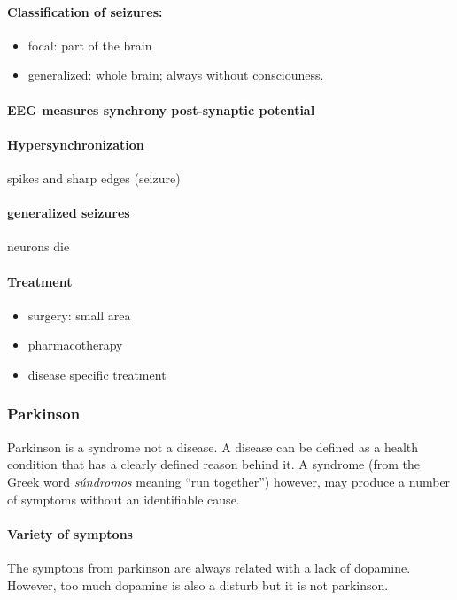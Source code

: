 \documentclass[12pt,article,oneside,a4paper]{memoir}
\begin{document}
\paragraph{Classification of seizures:}
\begin{itemize}
\item focal: part of the brain
\item generalized: whole brain; always without consciouness.
\end{itemize}

\paragraph{EEG measures synchrony post-synaptic potential}

\paragraph{Hypersynchronization}
spikes and sharp edges (seizure)

\paragraph{generalized seizures}
neurons die

\paragraph{Treatment}
\begin{itemize}
\item surgery: small area
\item pharmacotherapy
\item disease specific treatment
\end{itemize}

\subsubsection{Parkinson}
Parkinson is a syndrome not a disease. A disease can be defined as a health
condition that has a clearly defined reason behind it. A syndrome (from the
Greek word \textit{súndromos} meaning ``run together'') however, may produce
a number of symptoms without an identifiable cause.

\paragraph{Variety of symptons}
The symptons from parkinson are always related with a lack of dopamine.
However, too much dopamine is also a disturb but it is not parkinson.
\end{document}
